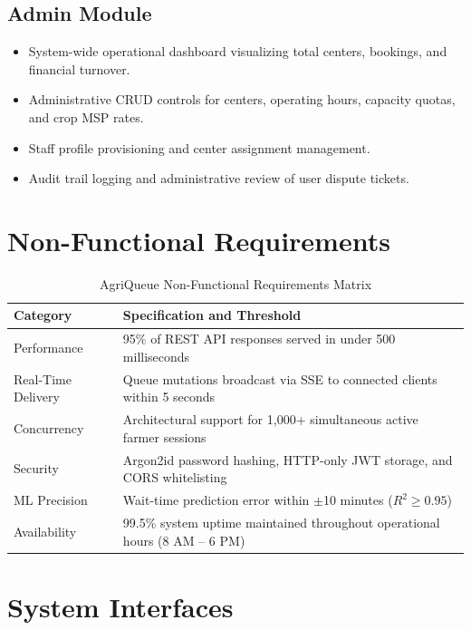 \subsection{Admin Module}
\begin{itemize}
  \item System-wide operational dashboard visualizing total centers, bookings, and financial turnover.
  \item Administrative CRUD controls for centers, operating hours, capacity quotas, and crop MSP rates.
  \item Staff profile provisioning and center assignment management.
  \item Audit trail logging and administrative review of user dispute tickets.
\end{itemize}

\section{Non-Functional Requirements}

\begin{table}[H]
\centering
\caption{AgriQueue Non-Functional Requirements Matrix}
\label{tab:nfr}
\renewcommand{\arraystretch}{1.2}
\begin{tabular}{|p{3cm}|p{10.5cm}|}
\hline
\textbf{Category} & \textbf{Specification and Threshold} \\ \hline
Performance & 95\% of REST API responses served in under 500 milliseconds \\ \hline
Real-Time Delivery & Queue mutations broadcast via SSE to connected clients within 5 seconds \\ \hline
Concurrency & Architectural support for 1,000+ simultaneous active farmer sessions \\ \hline
Security & Argon2id password hashing, HTTP-only JWT storage, and CORS whitelisting \\ \hline
ML Precision & Wait-time prediction error within $\pm$10 minutes ($R^2 \geq 0.95$) \\ \hline
Availability & 99.5\% system uptime maintained throughout operational hours (8 AM -- 6 PM) \\ \hline
\end{tabular}
\end{table}

\section{System Interfaces}

